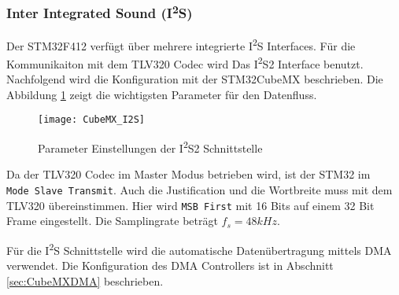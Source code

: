 \subsubsection{Inter Integrated Sound (I\textsuperscript{2}S)}
\label{sec:CubeMXI2S}

Der STM32F412 verfügt über mehrere integrierte I\textsuperscript{2}S Interfaces. 
Für die Kommunikaiton mit dem TLV320 Codec wird Das I\textsuperscript{2}S2 Interface benutzt.
Nachfolgend wird die Konfiguration mit der STM32CubeMX beschrieben.
Die Abbildung \ref{pic:CubeMX_I2S} zeigt die wichtigsten Parameter für den Datenfluss.

\begin{figure}[H]
	\centering
	\texttt{[image: CubeMX\_I2S]}
	\caption{Parameter Einstellungen der I\textsuperscript{2}S2 Schnittstelle}
	\label{pic:CubeMX_I2S}
\end{figure}

Da der TLV320 Codec im Master Modus betrieben wird, ist der STM32 im \\
\texttt{Mode Slave Transmit}.
Auch die Justification und die Wortbreite muss mit dem TLV320 übereinstimmen. Hier wird \texttt{MSB First} mit 16 Bits auf einem 32 Bit Frame eingestellt.
Die Samplingrate beträgt $f_s = 48\si{kHz}$.

Für die I\textsuperscript{2}S Schnittstelle wird die automatische Datenübertragung mittels DMA verwendet. Die Konfiguration des DMA Controllers ist in Abschnitt \ref{sec:CubeMXDMA} beschrieben.

